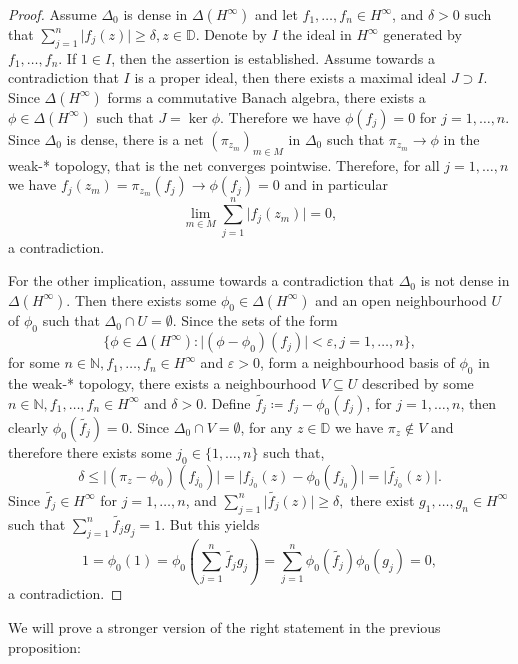 \documentclass[letterpaper, 11pt]{article}
\newcommand{\D}{\mathbb{D}}
\newcommand{\N}{\mathbb{N}}
\newcommand{\1}{\mathds{1}}
\theoremstyle{definition}
\begin{document}
\begin{proof}
  Assume $\Delta_0$ is dense in $\Delta(H^\infty)$ and let $f_1, \dots, f_n \in H^\infty$, and $\delta > 0$ such that $\sum_{j=1}^n \vert f_j(z) \vert \geq \delta, z \in \D$. Denote by $I$ the ideal in $H^\infty$ generated by $f_1, \dots, f_n$. If $1 \in I$, then the assertion is established. Assume towards a contradiction that $I$ is a proper ideal, then there exists a maximal ideal $J \supset I$. Since $\Delta(H^\infty)$ forms a commutative Banach algebra, there exists a $\phi \in \Delta(H^\infty)$ such that $J = \ker \phi$. Therefore we have $\phi(f_j) = 0$ for $j=1,\dots,n$. Since $\Delta_0$ is dense, there is a net $(\pi_{z_m})_{m \in M}$ in $\Delta_0$ such that $\pi_{z_m} \to \phi$ in the weak\nobreakdash-* topology, that is the net converges pointwise. Therefore, for all $j=1,\dots,n$ we have $f_j(z_m) = \pi_{z_m}(f_j) \to \phi(f_j) = 0$ and in particular
  $$ \lim_{m \in M} \sum_{j=1}^n \vert f_j(z_m) \vert = 0, $$
  a contradiction.

  For the other implication, assume towards a contradiction that $\Delta_0$ is not dense in $\Delta(H^\infty)$. Then there exists some $\phi_0 \in \Delta(H^\infty)$ and an open neighbourhood $U$ of $\phi_0$ such that $\Delta_0 \cap U = \emptyset$. Since the sets of the form
  $$ \{ \phi \in \Delta(H^\infty) : \vert (\phi - \phi_0)(f_j) \vert < \varepsilon, j = 1, \dots, n \}, $$
  for some $n \in \N, f_1, \dots, f_n \in H^\infty$ and $\varepsilon > 0$, form a neighbourhood basis of $\phi_0$ in the weak\nobreakdash-* topology, there exists a neighbourhood $V \subseteq U$ described by some $n \in \N, f_1, \dots, f_n \in H^\infty$ and $\delta > 0$. Define $\widetilde{f_j} \coloneqq f_j - \phi_0(f_j)$, for $j=1,\dots,n$, then clearly $\phi_0(\widetilde{f_j}) = 0$. Since $\Delta_0 \cap V = \emptyset$, for any $z \in \D$ we have $\pi_z \notin V$ and therefore there exists some $j_0 \in \{ 1, \dots, n \}$ such that,
  $$ \delta \leq \vert (\pi_z - \phi_0)(f_{j_0}) \vert = \vert f_{j_0}(z) - \phi_0(f_{j_0}) \vert = \vert \widetilde{f_{j_0}}(z) \vert. $$
  Since $\widetilde{f_j} \in H^\infty$ for $j=1,\dots,n$, and $ \sum_{j=1}^n \vert \widetilde{f_j}(z) \vert \geq \delta, $ there exist $g_1, \dots, g_n \in H^\infty$ such that $\sum_{j=1}^n \widetilde{f_j} g_j = 1$. But this yields
  $$ 1 = \phi_0(1) = \phi_0 \left( \sum_{j=1}^n \widetilde{f_j} g_j \right) = \sum_{j=1}^n \phi_0(\widetilde{f_j}) \phi_0(g_j) = 0, $$
  a contradiction.
\end{proof}

We will prove a stronger version of the right statement in the previous proposition:
\end{document}
